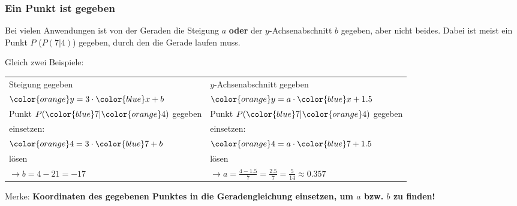 
\subsubsection{Ein Punkt ist gegeben}
Bei vielen Anwendungen ist von der Geraden die Steigung $a$
\textbf{oder} der $y$-Achsenabschnitt $b$ gegeben, aber nicht
beides. Dabei ist meist ein Punkt $P$ (\zB $P(7|4)$) gegeben, durch
den die Gerade laufen muss.

Gleich zwei Beispiele:

\begin{tabular}{p{8cm}|p{8cm}}
  Steigung gegeben & $y$-Achsenabschnitt gegeben \\
  ${\color{orange}y}=3\cdot{}{\color{blue}x}+b$ & ${\color{orange}y}=a\cdot{}{\color{blue}x}+1.5$\\
  \hline
  Punkt $P({\color{blue}7}|{\color{orange}4})$ gegeben & Punkt $P({\color{blue}7}|{\color{orange}4})$ gegeben\\
  \hline
  einsetzen: & einsetzen: \\
  ${\color{orange}4} = 3\cdot{}{\color{blue}7} + b$ & ${\color{orange}4}=a\cdot{}{\color{blue}7} + 1.5$\\
  \hline
  lösen & lösen\\
  $\longrightarrow b=4-21=-17$ & $\longrightarrow a=\frac{4-1.5}{7} =\frac{2.5}{7}=\frac{5}{14} \approx{} 0.357$

  \end{tabular}


Merke: \textbf{Koordinaten des gegebenen Punktes in die
  Geradengleichung einsetzen, um $a$ bzw. $b$ zu finden!}

